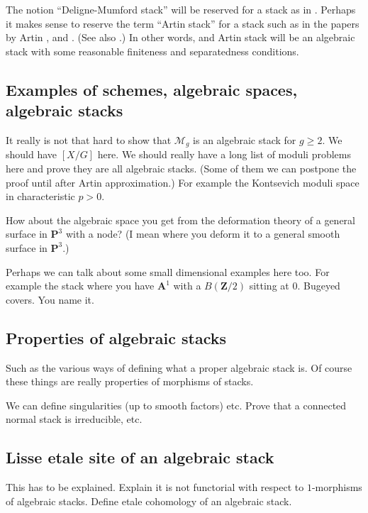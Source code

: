 \smallskip\noindent
The notion ``Deligne-Mumford stack'' will be reserved for a stack as in 
\cite{DM}. Perhaps it makes sense to reserve the term ``Artin stack'' for
a stack such as in the papers by Artin \cite{Artin}, and \cite{ArtinVersal}.
(See also \cite{ConradeJong}.) In other words, and Artin stack will be an
algebraic stack with some reasonable finiteness and separatedness conditions.

\subsection{Examples of schemes, algebraic spaces, algebraic stacks}
\label{subsection-examples-stacks}

\noindent
It really is not that hard to show that $\mathcal{M}_g$ is an algebraic
stack for $g\geq 2$. We should have $[X/G]$ here. We should really
have a long list of moduli problems here and prove they are all algebraic
stacks. (Some of them we can postpone the proof until after Artin
approximation.) For example the Kontsevich moduli space in characteristic 
$p > 0$.

\smallskip\noindent
How about the algebraic space you get from the deformation theory of
a general surface in $\mathbf{P}^3$ with a node? (I mean where you deform
it to a general smooth surface in $\mathbf{P}^3$.)

\smallskip\noindent
Perhaps we can talk about some small dimensional examples here too. 
For example the stack where you have $\mathbf{A}^1$ with a $B(\mathbf{Z}/2)$ 
sitting at $0$. Bugeyed covers. You name it.

\subsection{Properties of algebraic stacks}
\label{subsection-stacks-properties}

\noindent
Such as the various ways of defining what a proper algebraic stack is.
Of course these things are really properties of morphisms of stacks.

\smallskip\noindent
We can define singularities (up to smooth factors) etc. Prove that a 
connected normal stack is irreducible, etc.

\subsection{Lisse etale site of an algebraic stack}
\label{subsection-lisse-etale}

\noindent
This has to be explained. Explain it is not functorial with respect to
$1$-morphisms of algebraic stacks. Define etale cohomology of an algebraic 
stack.

